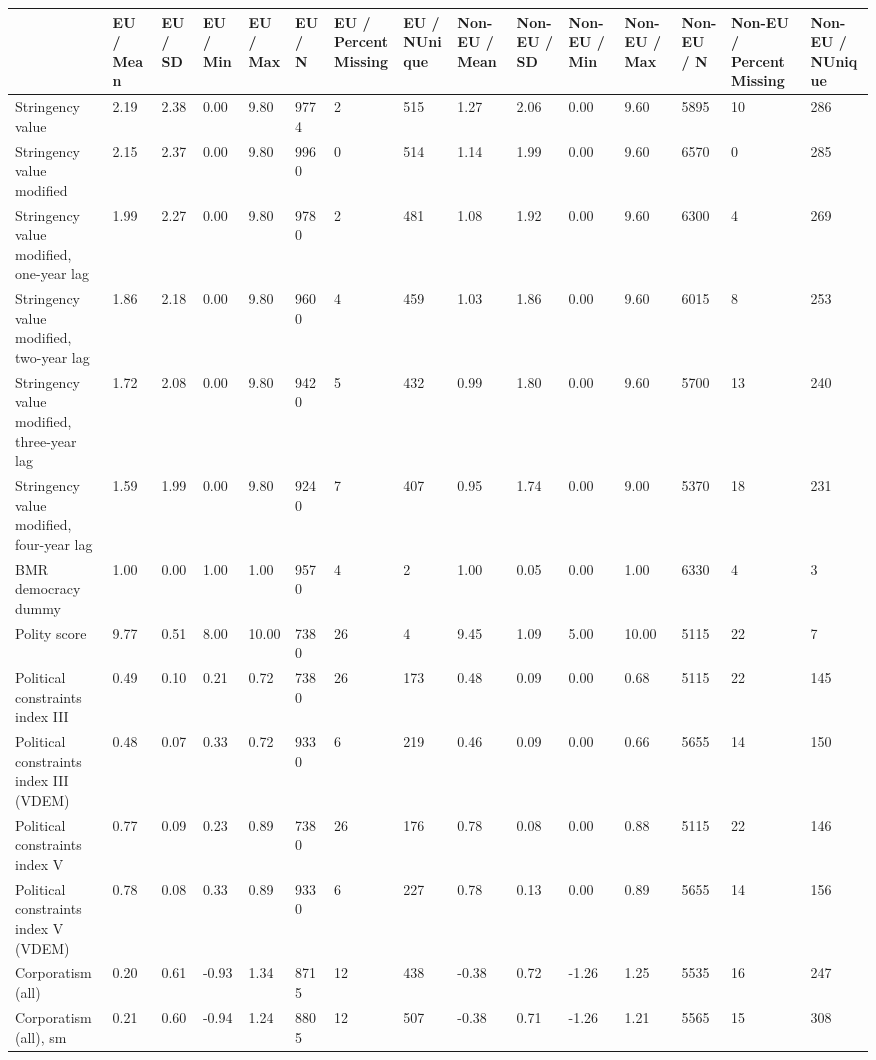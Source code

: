 
\begin{longtable}{lllllllllllllll}
\toprule
  & EU / Mean & EU / SD & EU / Min & EU / Max & EU / N & EU / PercentMissing & EU / NUnique & Non-EU / Mean & Non-EU / SD & Non-EU / Min & Non-EU / Max & Non-EU / N & Non-EU / PercentMissing & Non-EU / NUnique\\
\midrule
Stringency value & 2.19 & 2.38 & 0.00 & 9.80 & 9774 & 2 & 515 & 1.27 & 2.06 & 0.00 & 9.60 & 5895 & 10 & 286\\
Stringency value modified & 2.15 & 2.37 & 0.00 & 9.80 & 9960 & 0 & 514 & 1.14 & 1.99 & 0.00 & 9.60 & 6570 & 0 & 285\\
Stringency value modified, one-year lag & 1.99 & 2.27 & 0.00 & 9.80 & 9780 & 2 & 481 & 1.08 & 1.92 & 0.00 & 9.60 & 6300 & 4 & 269\\
Stringency value modified, two-year lag & 1.86 & 2.18 & 0.00 & 9.80 & 9600 & 4 & 459 & 1.03 & 1.86 & 0.00 & 9.60 & 6015 & 8 & 253\\
Stringency value modified, three-year lag & 1.72 & 2.08 & 0.00 & 9.80 & 9420 & 5 & 432 & 0.99 & 1.80 & 0.00 & 9.60 & 5700 & 13 & 240\\
\addlinespace
Stringency value modified, four-year lag & 1.59 & 1.99 & 0.00 & 9.80 & 9240 & 7 & 407 & 0.95 & 1.74 & 0.00 & 9.00 & 5370 & 18 & 231\\
BMR democracy dummy & 1.00 & 0.00 & 1.00 & 1.00 & 9570 & 4 & 2 & 1.00 & 0.05 & 0.00 & 1.00 & 6330 & 4 & 3\\
Polity score & 9.77 & 0.51 & 8.00 & 10.00 & 7380 & 26 & 4 & 9.45 & 1.09 & 5.00 & 10.00 & 5115 & 22 & 7\\
Political constraints index III & 0.49 & 0.10 & 0.21 & 0.72 & 7380 & 26 & 173 & 0.48 & 0.09 & 0.00 & 0.68 & 5115 & 22 & 145\\
Political constraints index III (VDEM) & 0.48 & 0.07 & 0.33 & 0.72 & 9330 & 6 & 219 & 0.46 & 0.09 & 0.00 & 0.66 & 5655 & 14 & 150\\
\addlinespace
Political constraints index V & 0.77 & 0.09 & 0.23 & 0.89 & 7380 & 26 & 176 & 0.78 & 0.08 & 0.00 & 0.88 & 5115 & 22 & 146\\
Political constraints index V (VDEM) & 0.78 & 0.08 & 0.33 & 0.89 & 9330 & 6 & 227 & 0.78 & 0.13 & 0.00 & 0.89 & 5655 & 14 & 156\\
Corporatism (all) & 0.20 & 0.61 & -0.93 & 1.34 & 8715 & 12 & 438 & -0.38 & 0.72 & -1.26 & 1.25 & 5535 & 16 & 247\\
Corporatism (all), sm & 0.21 & 0.60 & -0.94 & 1.24 & 8805 & 12 & 507 & -0.38 & 0.71 & -1.26 & 1.21 & 5565 & 15 & 308\\

\end{longtable}
